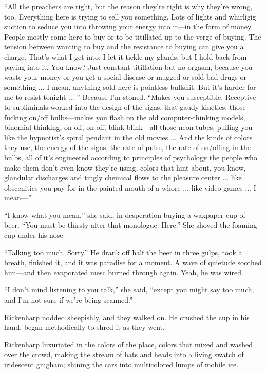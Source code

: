``All the preachers are right, but the reason they're right is why they're wrong, too. Everything here is trying to sell you something. Lots of lights and whirligig suction to seduce you into throwing your energy into it—in the form of money. People mostly come here to buy or to be titillated up to the verge of buying. The tension between wanting to buy and the resistance to buying can give you a charge. That's what I get into: I let it tickle my glands, but I hold back from paying into it. You know? Just constant titillation but no orgasm, because you waste your money or you get a social disease or mugged or sold bad drugs or something ... I mean, anything sold here is pointless bullshit. But it's harder for me to resist tonight ... '' Because I'm stoned. ``Makes you susceptible. Receptive to subliminals worked into the design of the signs, that gaudy kinetics, those fucking on/off bulbs—makes you flash on the old computer-thinking models, binomial thinking, on-off, on-off, blink blink—all those neon tubes, pulling you like the hypnotist's spiral pendant in the old movies ... And the kinds of colors they use, the energy of the signs, the rate of pulse, the rate of on/offing in the bulbs, all of it's engineered according to principles of psychology the people who make them don't even know they're using, colors that hint about, you know, glandular discharges and tingly chemical flows to the pleasure center ... like obscenities you pay for in the painted mouth of a whore ... like video games ... I mean—''

``I know what you mean,'' she said, in desperation buying a waxpaper cup of beer. ``You must be thirsty after that monologue. Here.'' She shoved the foaming cup under his nose.

``Talking too much. Sorry.'' He drank off half the beer in three gulps, took a breath, finished it, and it was paradise for a moment. A wave of quietude soothed him—and then evaporated mesc burned through again. Yeah, he was wired.

``I don't mind listening to you talk,'' she said, ``except you might say too much, and I'm not sure if we're being scanned.''

Rickenharp nodded sheepishly, and they walked on. He crushed the cup in his hand, began methodically to shred it as they went.

Rickenharp luxuriated in the colors of the place, colors that mixed and washed over the crowd, making the stream of hats and heads into a living swatch of iridescent gingham; shining the cars into multicolored lumps of mobile ice.

